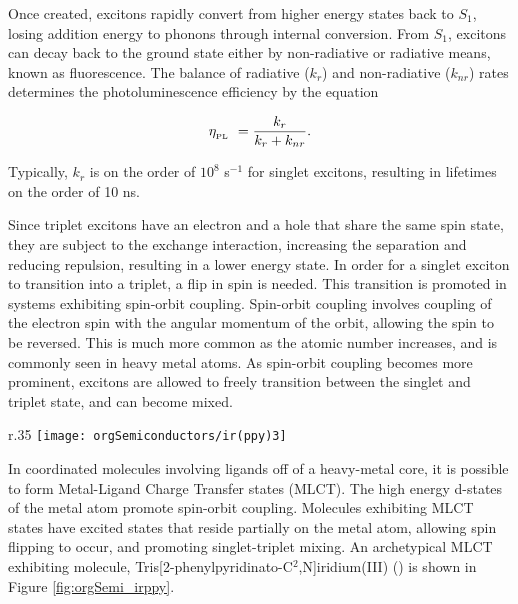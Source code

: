 \documentclass[../thesis.tex]{subfiles}
\begin{document}
Once created, excitons rapidly convert from higher energy states back to $S_1$, losing addition energy to phonons through internal conversion.
From $S_1$, excitons can decay back to the ground state either by non-radiative or radiative means, known as fluorescence.
The balance of radiative ($k_r$) and non-radiative ($k_{nr}$) rates determines the photoluminescence efficiency by the equation

\begin{equation}
\eta_{_\text{\tiny PL}}\ =\frac{k_r}{k_r+k_{nr}}.
\label{orgSemi_pl_efficiency}
\end{equation}


Typically, $k_r$ is on the order of $10^8$ s$^{-1}$ for singlet excitons, resulting in lifetimes on the order of 10 ns.\supercite{Turro1991a,Menke2013}

Since triplet excitons have an electron and a hole that share the same spin state, they are subject to the exchange interaction, increasing the separation and reducing repulsion, resulting in a lower energy state.
In order for a singlet exciton to transition into a triplet, a flip in spin is needed.  
This transition is promoted in systems exhibiting spin-orbit coupling.
Spin-orbit coupling involves coupling of the electron spin with the angular momentum of the orbit, allowing the spin to be reversed.
This is much more common as the atomic number increases, and is commonly seen in heavy metal atoms.
As spin-orbit coupling becomes more prominent, excitons are allowed to freely transition between the singlet and triplet state, and can become mixed.

\begin{wrapfigure}{r}{.35\textwidth}
\centering
\texttt{[image: orgSemiconductors/ir(ppy)3]}
\caption{\irppy, a commonly used OLED molecule with an excited state which exhibits MLCT.}
\label{fig:orgSemi_irppy}
\end{wrapfigure}

In coordinated molecules involving ligands off of a heavy-metal core, it is possible to form Metal-Ligand Charge Transfer states (MLCT).
The high energy d-states of the metal atom promote spin-orbit coupling.
Molecules exhibiting MLCT states have excited states that reside partially on the metal atom, allowing spin flipping to occur, and promoting singlet-triplet mixing.
An archetypical MLCT exhibiting molecule, Tris[2-phenylpyridinato-C$^2$,N]iridium(III) (\irppy) is shown in Figure \ref{fig:orgSemi_irppy}.
\end{document}
